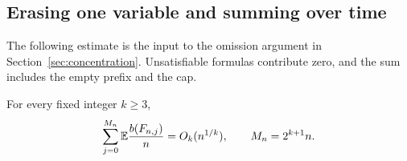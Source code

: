 \subsection{Erasing one variable and summing over time}

The following estimate is the input to the omission argument in
Section~\ref{sec:concentration}. Unsatisfiable formulas contribute zero,
and the sum includes the empty prefix and the cap.

\begin{proposition}\label{prop:forcing}
For every fixed integer \(k\ge3\),
\begin{equation}\label{eq:integrated}
 \sum_{j=0}^{M_n}\mathbb E\frac{b(F_{n,j})}{n}=O_k(n^{1/k}),
 \qquad M_n=2^{k+1}n.
\end{equation}
\end{proposition}

